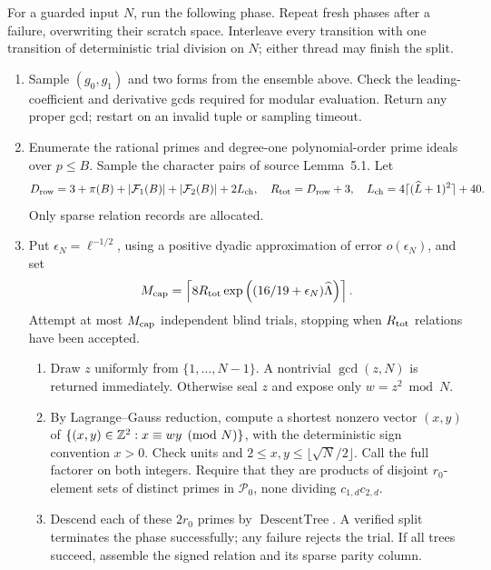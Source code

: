 \begin{algorithm}
\label{rf:phasealgorithm}
For a guarded input $N$, run the following phase.  Repeat fresh
phases after a failure, overwriting their scratch space.  Interleave
every transition with one transition of deterministic trial division
on $N$; either thread may finish the split.
\begin{enumerate}[leftmargin=*]
\item Sample $(g_0,g_1)$ and two forms from the ensemble above.
Check the leading-coefficient and derivative gcds required for
modular evaluation.  Return any proper gcd; restart on an invalid
tuple or sampling timeout.
\item Enumerate the rational primes and degree-one polynomial-order
prime ideals over $p\le B$.  Sample the character pairs of source
Lemma~5.1.  Let
\[
 D_{\rm row}=3+\pi(B)+|\mathcal F_1(B)|+|\mathcal F_2(B)|+2L_{\rm ch},
 \quad R_{
 \rm tot}=D_{\rm row}+3,
 \quad L_{\rm ch}=4\lceil(\widehat L+1)^2\rceil+40.
\]
Only sparse relation records are allocated.
\item Put $\epsilon_N=\ell^{-1/2}$, using a positive dyadic
approximation of error $o(\epsilon_N)$, and set
\begin{equation}
 M_{\rm cap}=\left\lceil8R_{\rm tot}
       \exp\left((16/19+\epsilon_N)\widehat\Lambda\right)\right\rceil.
 \label{rf:trialcap}
\end{equation}
Attempt at most $M_{\rm cap}$ independent blind trials, stopping
when $R_{\rm tot}$ relations have been accepted.
\begin{enumerate}[label=\textup{(\alph*)},leftmargin=*]
\item Draw $z$ uniformly from $\{1,\ldots,N-1\}$.
A nontrivial $\gcd(z,N)$ is returned immediately.  Otherwise seal
$z$ and expose only $w=z^2\bmod N$.
\item By Lagrange--Gauss reduction, compute a shortest nonzero
vector $(x,y)$ of
$\{(x,y)\in\mathbb Z^2:x\equiv wy\pmod N\}$, with the deterministic
sign convention $x>0$.  Check units and
$2\le x,y\le\lfloor\sqrt N/2\rfloor$.  Call the full factorer on
both integers.  Require that they are products of disjoint
$r_0$-element sets of distinct primes in $\mathcal P_0$, none
dividing $c_{1,d}c_{2,d}$.
\item Descend each of these $2r_0$ primes by
$\operatorname{DescentTree}$.  A verified split terminates the
phase successfully; any failure rejects the trial.  If all trees
succeed, assemble the signed relation and its sparse parity column.

\end{enumerate}
\end{enumerate}
\end{algorithm}
